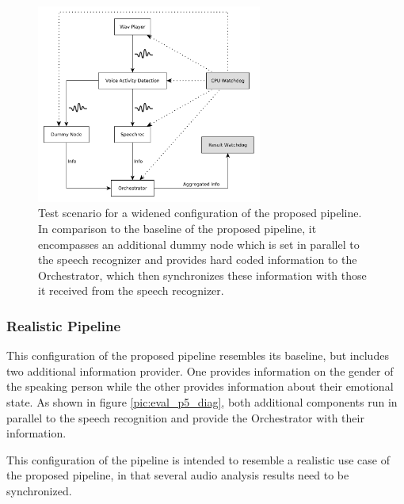 \begin{figure}[]
	\centering
	\includegraphics[width=0.66\textwidth]{diagrams/eval_pipeline_3.pdf}
	\caption{Test scenario for a widened configuration of the proposed pipeline.
		In comparison to the baseline of the proposed pipeline, it encompasses an additional dummy node which is set in parallel to the speech recognizer and provides hard coded information to the Orchestrator, which then synchronizes these information with those it received from the speech recognizer.}
	\label{pic:eval_p3_diag}
\end{figure}


\subsubsection{Realistic Pipeline}
This configuration of the proposed pipeline resembles its baseline, but includes two additional information provider. 
One provides information on the gender of the speaking person while the other provides information about their emotional state.
As shown in figure \ref{pic:eval_p5_diag}, both additional components run in parallel to the speech recognition and provide the Orchestrator with their information.

This configuration of the pipeline is intended to resemble a realistic use case of the proposed pipeline, in that several audio analysis results need to be synchronized.

